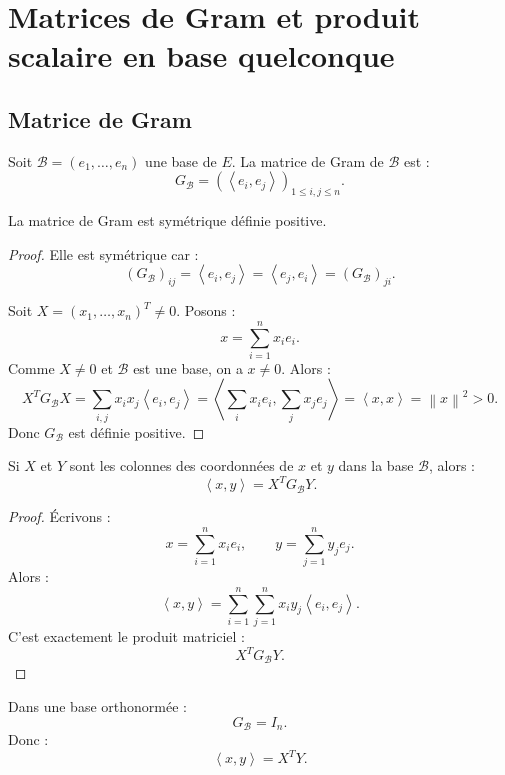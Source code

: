 \documentclass[11pt,a4paper]{article}
\newcommand{\norme}[1]{\left\lVert #1\right\rVert}
\newcommand{\scal}[2]{\left\langle #1,#2\right\rangle}
\begin{document}
\section{Matrices de Gram et produit scalaire en base quelconque}

\subsection{Matrice de Gram}

\begin{definitionbox}
Soit \(\mathcal B=(e_1,\dots,e_n)\) une base de \(E\).  
La matrice de Gram de \(\mathcal B\) est :
\[
G_{\mathcal B}=(\scal{e_i}{e_j})_{1\leq i,j\leq n}.
\]
\end{definitionbox}

\begin{theorembox}
La matrice de Gram est symétrique définie positive.
\end{theorembox}

\begin{proof}
Elle est symétrique car :
\[
(G_{\mathcal B})_{ij}=\scal{e_i}{e_j}=\scal{e_j}{e_i}=(G_{\mathcal B})_{ji}.
\]

Soit \(X=(x_1,\dots,x_n)^T\neq0\).  
Posons :
\[
x=\sum_{i=1}^n x_ie_i.
\]
Comme \(X\neq0\) et \(\mathcal B\) est une base, on a \(x\neq0\).  
Alors :
\[
X^TG_{\mathcal B}X
=
\sum_{i,j}x_ix_j\scal{e_i}{e_j}
=
\scal{\sum_i x_ie_i}{\sum_j x_je_j}
=
\scal{x}{x}
=
\norme{x}^2>0.
\]
Donc \(G_{\mathcal B}\) est définie positive.
\end{proof}

\begin{theorembox}
Si \(X\) et \(Y\) sont les colonnes des coordonnées de \(x\) et \(y\) dans la base \(\mathcal B\), alors :
\[
\scal{x}{y}=X^TG_{\mathcal B}Y.
\]
\end{theorembox}

\begin{proof}
Écrivons :
\[
x=\sum_{i=1}^n x_ie_i,
\qquad
y=\sum_{j=1}^n y_je_j.
\]
Alors :
\[
\scal{x}{y}
=
\sum_{i=1}^n\sum_{j=1}^n x_iy_j\scal{e_i}{e_j}.
\]
C'est exactement le produit matriciel :
\[
X^TG_{\mathcal B}Y.
\]
\end{proof}

\begin{retenirbox}
Dans une base orthonormée :
\[
G_{\mathcal B}=I_n.
\]
Donc :
\[
\scal{x}{y}=X^TY.
\]
\end{retenirbox}
\end{document}
